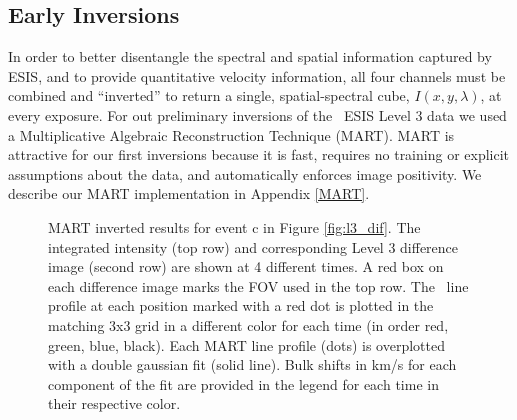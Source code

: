     
    
    \subsection{Early Inversions} \label{sec:inversions}
    	In order to better disentangle the spectral and spatial information captured by ESIS, and to provide quantitative velocity information, all four channels must be combined and ``inverted'' to return a single, spatial-spectral cube, $I(x,y,\lambda)$, at every exposure.
    	For out preliminary inversions of the \ov \  ESIS Level 3 data we used a Multiplicative Algebraic Reconstruction Technique (MART).
    	MART is attractive for our first inversions because it is fast, requires no training or explicit assumptions about the data, and automatically enforces image  positivity.
    	We describe our MART implementation in %
    	Appendix \ref{MART}.
    	
    	\begin{figure}[htb!]
    		\centering
    		\caption{MART inverted results for event c in Figure \ref{fig:l3_dif}. The integrated intensity (top row) and corresponding Level 3 difference image (second row) are shown at 4 different times. A red box on each difference image marks the FOV used in the top row.  The \ov \ line profile at each position marked with a red dot is plotted in the matching 3x3 grid in a different color for each time (in order red, green, blue, black). Each MART line profile (dots) is overplotted with a double gaussian fit (solid line).  Bulk shifts in km/s for each component of the fit are provided in the legend for each time in their respective color. }
    		\label{fig:perfect_x_inverted}
    	\end{figure}
        
